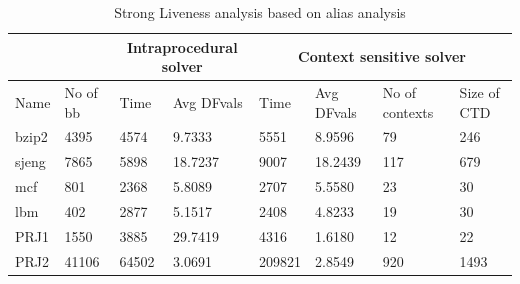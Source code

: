 \documentclass[12pt]{report}
\begin{document}
\begin {table}[H]
\label{tab:specclive} 
\begin{flushleft}
\begin{tabular}{|l | l | l | p{2.3cm} | l | p{2.3cm} | p{1.4cm} | p{1.2cm} | }
  \hline                        
  \multicolumn{2}{|c|}{} &
  \multicolumn{2}{|c|}{Intraprocedural solver} &
  \multicolumn{4}{|c|}{Context sensitive solver} \\
  \hline
  Name & No of bb & Time & Avg DFvals &  Time  & Avg DFvals    & No of \newline contexts  & Size of \newline CTD \\  \hline  
  bzip2& 4395     & 4574 &  9.7333    & 5551   & 8.9596        & 79                       & 246                  \\ \hline  
  sjeng& 7865     & 5898 &  18.7237   & 9007   & 18.2439       & 117                      & 679                  \\  \hline  
  mcf  & 801      & 2368 &  5.8089    & 2707   & 5.5580        & 23                       & 30                   \\  \hline
  lbm  & 402      & 2877 &  5.1517    & 2408   & 4.8233        & 19                       & 30                   \\  \hline
  PRJ1 & 1550     & 3885 &  29.7419   & 4316   & 1.6180        & 12                       & 22                   \\  \hline
  PRJ2 & 41106    & 64502&  3.0691    & 209821 & 2.8549        & 920                      & 1493                 \\  \hline  

\end{tabular}
\end{flushleft}
\caption {Strong Liveness analysis based on alias analysis}
\end {table}
\end{document}
